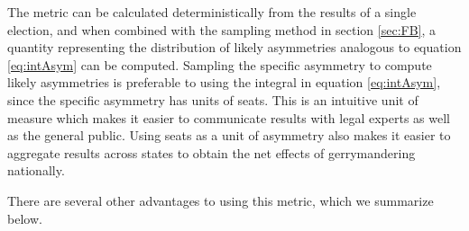 \documentclass[preprint,12pt]{article}
\begin{document}
The metric can be calculated deterministically from the results of a single election, and when combined with the sampling method in section \ref{sec:FB}, a quantity representing the distribution of likely asymmetries analogous to equation \ref{eq:intAsym} can be computed.
Sampling the specific asymmetry to compute likely asymmetries is preferable to using the integral in equation \ref{eq:intAsym}, since the specific asymmetry has units of seats.
This is an intuitive unit of measure which makes it easier to communicate results with legal experts as well as the general public.
Using seats as a unit of asymmetry also makes it easier to aggregate results across states to obtain the net effects of gerrymandering nationally.

There are several other advantages to using this metric, which we summarize below.
\end{document}
